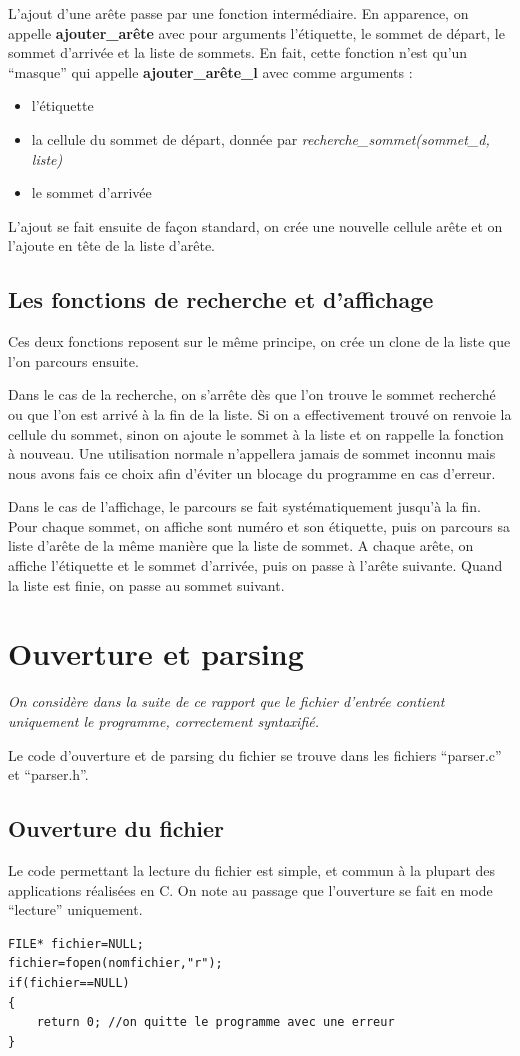 \documentclass[a4paper,11pt]{article}
\begin{document}
		L'ajout d'une arête passe par une fonction intermédiaire. En apparence, on appelle \textbf{ajouter\_arête} avec pour arguments l'étiquette, le sommet de départ, le sommet d'arrivée et la liste de sommets. En fait, cette fonction n'est qu'un ``masque'' qui appelle \textbf{ajouter\_arête\_l} avec comme arguments : 
		\begin{itemize}
			\item l'étiquette
			\item la cellule du sommet de départ, donnée par \textit{recherche\_sommet(sommet\_d, liste)}
			\item le sommet d'arrivée
		\end{itemize}
		L'ajout se fait ensuite de façon standard, on crée une nouvelle cellule arête et on l'ajoute en tête de la liste d'arête.
	\subsection{Les fonctions de recherche et d'affichage}
		Ces deux fonctions reposent sur le même principe, on crée un clone de la liste que l'on parcours ensuite.

 Dans le cas de la recherche, on s'arrête dès que l'on trouve le sommet recherché ou que l'on est arrivé à la fin de la liste. Si on a effectivement trouvé on renvoie la cellule du sommet, sinon on ajoute le sommet à la liste et on rappelle la fonction à nouveau. Une utilisation normale n'appellera jamais de sommet inconnu mais nous avons fais ce choix afin d'éviter un blocage du programme en cas d'erreur.

	Dans le cas de l'affichage, le parcours se fait systématiquement jusqu'à la fin. Pour chaque sommet, on affiche sont numéro et son étiquette, puis on parcours sa liste d'arête de la même manière que la liste de sommet. A chaque arête, on affiche l'étiquette et le sommet d'arrivée, puis on passe à l'arête suivante. Quand la liste est finie, on passe au sommet suivant.

	\section{Ouverture et parsing}
		\textit{On considère dans la suite de ce rapport que le fichier d'entrée contient uniquement le programme, correctement syntaxifié.}
		
		Le code d'ouverture et de parsing du fichier se trouve dans les fichiers ``parser.c'' et ``parser.h''.
		\subsection{Ouverture du fichier}
		Le code permettant la lecture du fichier est simple, et commun à la plupart des applications réalisées en C. On note au passage que l'ouverture se fait en mode ``lecture'' uniquement.
		\begin{lstlisting}
FILE* fichier=NULL;
fichier=fopen(nomfichier,"r");
if(fichier==NULL)
{
	return 0; //on quitte le programme avec une erreur
}
		\end{lstlisting}
\end{document}
